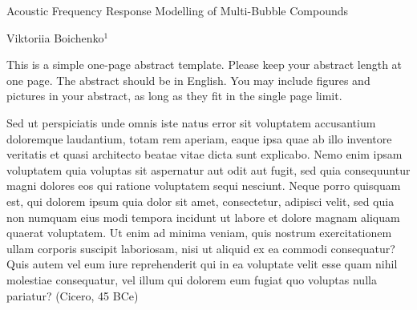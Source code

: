         
        
       


\Large
 \begin{center}
    Acoustic Frequency Response Modelling of Multi-Bubble Compounds

\hspace{10pt}

\large
Viktoriia Boichenko$^1$ \\

\hspace{10pt}

\small  

\end{center}

\hspace{10pt}

\normalsize

This is a simple one-page abstract template. Please keep your abstract length at one page. The abstract should be in English. You may include figures and pictures in your abstract, as long as they fit in the single page limit.

Sed ut perspiciatis unde omnis iste natus error sit voluptatem accusantium doloremque laudantium, totam rem aperiam, eaque ipsa quae ab illo inventore veritatis et quasi architecto beatae vitae dicta sunt explicabo. Nemo enim ipsam voluptatem quia voluptas sit aspernatur aut odit aut fugit, sed quia consequuntur magni dolores eos qui ratione voluptatem sequi nesciunt. Neque porro quisquam est, qui dolorem ipsum quia dolor sit amet, consectetur, adipisci velit, sed quia non numquam eius modi tempora incidunt ut labore et dolore magnam aliquam quaerat voluptatem. Ut enim ad minima veniam, quis nostrum exercitationem ullam corporis suscipit laboriosam, nisi ut aliquid ex ea commodi consequatur? Quis autem vel eum iure reprehenderit qui in ea voluptate velit esse quam nihil molestiae consequatur, vel illum qui dolorem eum fugiat quo voluptas nulla pariatur? (Cicero, 45 BCe)